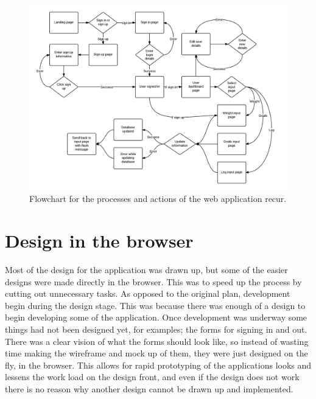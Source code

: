 \begin{figure}[!ht]
\centering
\includegraphics[scale=0.3]{chapters/figs/flowchart}
\caption{Flowchart for the processes and actions of the web application recur.}
\label{fig:flowchart}
\end{figure}

\section{Design in the browser}
Most of the design for the application was drawn up, but some of the easier designs were made directly in the browser. This was to speed up the process by cutting out unnecessary tasks. As opposed to the original plan, development begin during the design stage. This was because there was enough of a design to begin developing some of the application. Once development was underway some things had not been designed yet, for examples; the forms for signing in and out. There was a clear vision of what the forms should look like, so instead of wasting time making the wireframe and mock up of them, they were just designed on the fly, in the browser. This allows for rapid prototyping of the applications looks and lessens the work load on the design front, and even if the design does not work there is no reason why another design cannot be drawn up and implemented.\\

